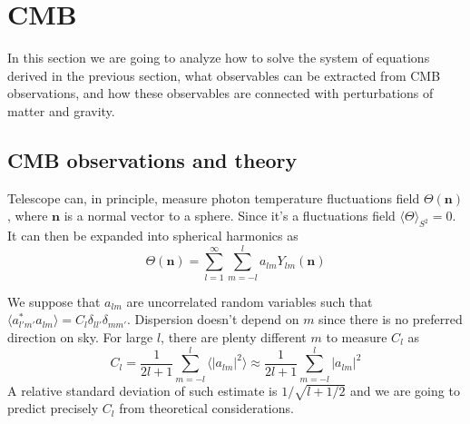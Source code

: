 \documentclass[12pt]{extarticle}
\numberwithin{problem}{section}
\numberwithin{theorem}{section}
\begin{document}
	\section{CMB}
	\label{sec:cmb}
	In this section we are going to analyze how to solve the system of equations derived in the previous section, what observables can be extracted from CMB observations, and how these observables are connected with perturbations of matter and gravity.
	
	\subsection{CMB observations and theory}
	\label{subsec:cmb-obs}
	Telescope can, in principle, measure photon temperature fluctuations field $\Theta(\mathbf{n})$, where $\mathbf{n}$ is a normal vector to a sphere. Since it's a fluctuations field $\langle\Theta\rangle_{S^2} = 0$. It can then be expanded into spherical harmonics as 
	\begin{equation}
		\Theta(\mathbf{n}) = \sum_{l=1}^\infty\sum_{m=-l}^l a_{lm}Y_{lm}(\mathbf{n})
	\end{equation}
	
	We suppose that $a_{lm}$ are uncorrelated random variables such that $\langle a_{l'm'}^*a_{lm}\rangle = C_l\delta_{ll'}\delta_{mm'}$. Dispersion doesn't depend on $m$ since there is no preferred direction on sky. For large $l$, there are plenty different $m$ to measure $C_l$ as
	\begin{equation}
		C_l = \frac{1}{2l+1}\sum_{m=-l}^l\langle|a_{lm}|^2\rangle\approx \frac{1}{2l+1}\sum_{m=-l}^l|a_{lm}|^2
	\end{equation}
	A relative standard deviation of such estimate is $1/\sqrt{l + 1/2}$ and we are going to predict precisely $C_l$ from theoretical considerations.
	
\end{document}
